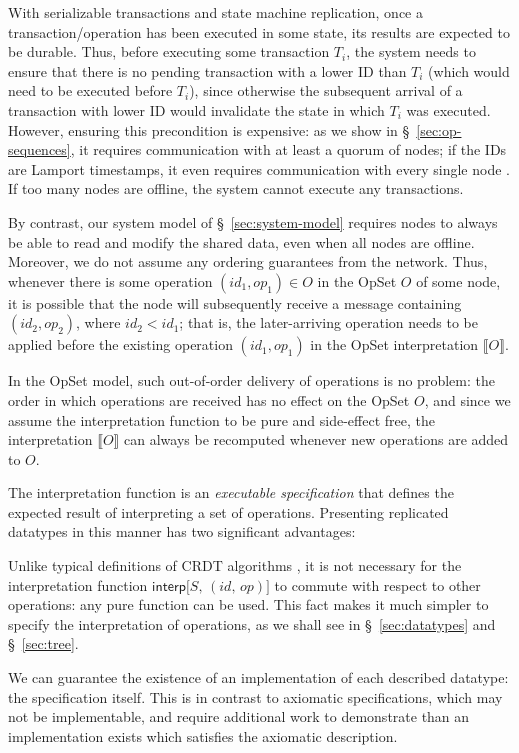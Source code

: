 With serializable transactions and state machine replication, once a transaction/operation has been executed in some state, its results are expected to be durable.
Thus, before executing some transaction $T_i$, the system needs to ensure that there is no pending transaction with a lower ID than $T_i$ (which would need to be executed before $T_i$), since otherwise the subsequent arrival of a transaction with lower ID would invalidate the state in which $T_i$ was executed.
However, ensuring this precondition is expensive: as we show in \S~\ref{sec:op-sequences}, it requires communication with at least a quorum of nodes; if the IDs are Lamport timestamps, it even requires communication with every single node \cite{Lamport:1978jq}.
If too many nodes are offline, the system cannot execute any transactions.

By contrast, our system model of \S~\ref{sec:system-model} requires nodes to always be able to read and modify the shared data, even when all nodes are offline.
Moreover, we do not assume any ordering guarantees from the network.
Thus, whenever there is some operation $(\mathit{id}_1, \mathit{op}_1) \in O$ in the OpSet $O$ of some node, it is possible that the node will subsequently receive a message containing $(\mathit{id}_2, \mathit{op}_2)$, where $\mathit{id}_2 < \mathit{id}_1$; that is, the later-arriving operation needs to be applied before the existing operation $(\mathit{id}_1, \mathit{op}_1)$ in the OpSet interpretation $\llbracket O \rrbracket$.

In the OpSet model, such out-of-order delivery of operations is no problem: the order in which operations are received has no effect on the OpSet $O$, and since we assume the interpretation function to be pure and side-effect free, the interpretation $\llbracket O \rrbracket$ can always be recomputed whenever new operations are added to $O$.

The interpretation function is an \emph{executable specification} that defines the expected result of interpreting a set of operations.
Presenting replicated datatypes in this manner has two significant advantages:
\begin{enumerate*}
\item
Unlike typical definitions of CRDT algorithms \cite{Shapiro:2011wy,Shapiro:2011un}, it is not necessary for the interpretation function $\mathsf{interp}\big[S,\, (\mathit{id},\, \mathit{op})\big]$ to commute with respect to other operations: any pure function can be used.
This fact makes it much simpler to specify the interpretation of operations, as we shall see in \S~\ref{sec:datatypes} and \S~\ref{sec:tree}.
\item
We can guarantee the existence of an implementation of each described datatype: the specification itself.
This is in contrast to axiomatic specifications, which may not be implementable, and require additional work to demonstrate than an implementation exists which satisfies the axiomatic description.
\end{enumerate*}

